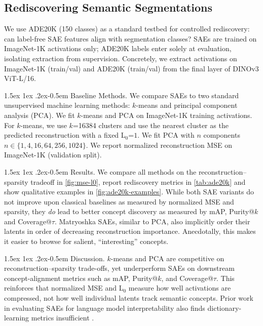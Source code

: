 \documentclass[10pt,twocolumn,letterpaper]{article}
\makeatletter
\renewcommand{\paragraph}{%
  \@startsection{paragraph}{4}%
  {\z@}{1.5ex \@plus 1ex \@minus .2ex}{-0.5em}%
  {\normalfont\normalsize\bfseries}%
}
\makeatother
\begin{document}
\subsection{Rediscovering Semantic Segmentations}\label{sec:ade20k}

We use ADE20K (150 classes) as a standard testbed for controlled rediscovery: can label-free SAE features align with segmentation classes? 
SAEs are trained on ImageNet-1K activations only; ADE20K labels enter solely at evaluation, isolating extraction from supervision.
Concretely, we extract activations on ImageNet-1K (train/val) and ADE20K (train/val) from the final layer of DINOv3 ViT-L/16. 


\paragraph{Baseline Methods.}
We compare SAEs to two standard unsupervised machine learning methods: $k$-means and principal component analysis (PCA).
We fit $k$-means and PCA on ImageNet-1K training activations.
For $k$-means, we use $k$=\num{16384} clusters and use the nearest cluster as the predicted reconstruction with a fixed L$_0$=$1$.
We fit PCA with $n$ components $n \in \{1,4,16,64,256,1024\}$.
We report normalized reconstruction MSE on ImageNet-1K (validation split).

\paragraph{Results.}
We compare all methods on the reconstruction--sparsity tradeoff in \cref{fig:mse-l0}, report rediscovery metrics in \cref{tab:ade20k} and show qualitative examples in \cref{fig:ade20k-examples}.
While both SAE variants do not improve upon classical baselines as measured by normalized MSE and sparsity, they \textit{do} lead to better concept discovery as measured by mAP, Purity@$k$ and Coverage@$\tau$.
Matryoshka SAEs, similar to PCA, also implicitly order their latents in order of decreasing reconstruction importance. 
Anecdotally, this makes it easier to browse for salient, ``interesting'' concepts.

\paragraph{Discussion.}
$k$-means and PCA are competitive on reconstruction--sparsity trade-offs, yet underperform SAEs on downstream concept-alignment metrics such as mAP, Purity@$k$, and Coverage@$\tau$. 
This reinforces that normalized MSE and L$_0$ measure how well activations are compressed, not how well individual latents track semantic concepts.
Prior work in evaluating SAEs for language model interpretability also finds dictionary-learning metrics insufficient \citep{karvonen2025saebench}.
\end{document}
